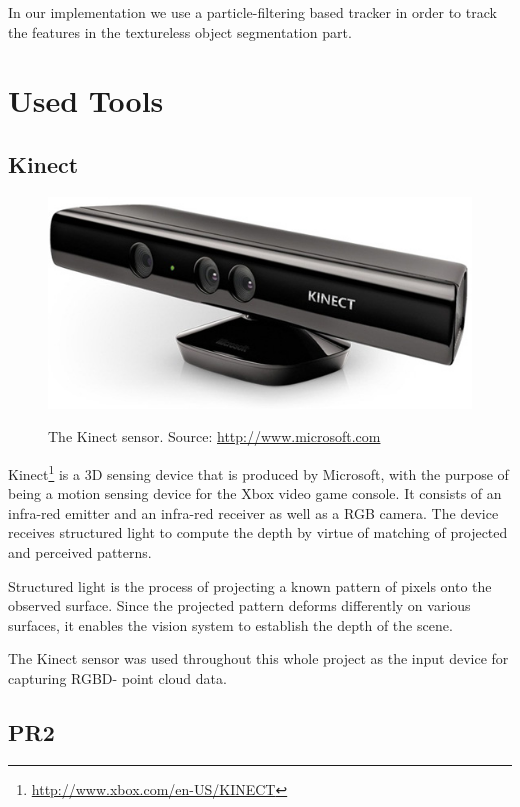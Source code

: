 In our implementation we use a particle-filtering based tracker in order to track the features in the textureless object segmentation part.      



\section{Used Tools}
\subsection{Kinect}

\begin{figure}
\centering

{\includegraphics[width=0.5\columnwidth]{figures/kinect.jpg}}

\caption{The Kinect sensor. Source: \url{http://www.microsoft.com}}
\label{fig:kinect}
\end{figure}

Kinect\footnote{\url{http://www.xbox.com/en-US/KINECT}} is a 3D sensing device that is produced by Microsoft, with the purpose of being a motion sensing device for the Xbox video game console. It consists of an infra-red emitter and an infra-red receiver as well as a RGB camera. The device receives structured light to compute the depth by virtue of matching of projected and perceived patterns.

Structured light is the process of projecting a known pattern of pixels onto the observed surface. Since the projected pattern deforms differently on various surfaces, it enables  the vision system to establish the depth of the scene.

The Kinect sensor was used throughout this whole project as the input device for capturing RGBD- point cloud  data.

\subsection{PR2}

